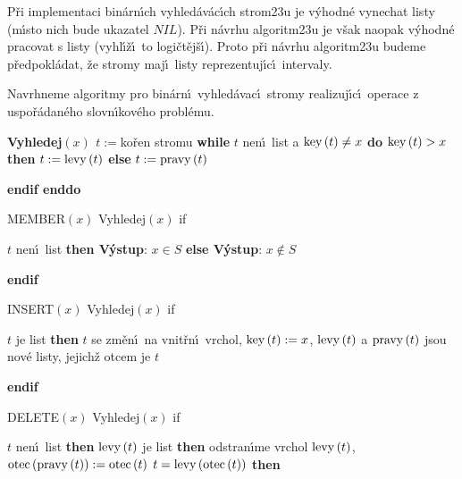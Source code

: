 \flushpar P\v ri implementaci bin\'arn\'\i ch vyhled\'av\'ac\'\i ch 
strom\accent23u je v\'yhodn\'e vynechat listy (m\'\i sto nich bude 
ukazatel $NIL$). P\v ri n\'avrhu algoritm\accent23u je v\v sak 
naopak v\'yhodn\'e 
pracovat s listy (vyhl\'\i\v z\'\i\ to logi\v ct\v ej\v s\'\i ). Proto p\v ri n\'avrhu 
algoritm\accent23u budeme p\v redpokl\'adat, \v ze stromy maj\'\i\ 
listy reprezentuj\'\i c\'\i\ intervaly.
\medskip

\flushpar Navrhneme algoritmy pro bin\'arn\'\i\ vyhled\'avac\'\i\ stromy 
rea\-lizuj\'\i\-c\'\i\ operace z uspo\v r\'adan\'eho slovn\'\i kov\'eho probl\'emu.
\medskip

{\bf Vyhledej$\left(x\right)$\newline 
$t:=$}ko\v ren stromu\newline 
{\bf while} $t$ nen\'\i\ list a $\operatorname{key}\left(t\right)\ne x$ {\bf do}\newline 
\phantom{---}{\bf if} $\operatorname{key}\left(t\right)>x$ {\bf then} $t:=\operatorname{levy}\left(t\right)$ {\bf else} $t:=\operatorname{pravy}\left(t\right)$ {\bf endif\newline 
enddo
\medskip

MEMBER$\left(x\right)$\newline 
Vyhledej$\left(x\right)$\newline 
if} $t$ nen\'\i\ list {\bf then V\'ystup}: $x\in S$ {\bf else V\'ystup}: $
x\notin S$ {\bf endif
\medskip

INSERT$\left(x\right)$\newline 
Vyhledej$\left(x\right)$\newline 
if} $t$ je list {\bf then}\newline 
\phantom{---}$t$ se zm\v en\'\i\ na vnit\v rn\'\i\ vrchol, $\operatorname{key}\left(t\right):=x$,\newline 
\phantom{---}$\operatorname{levy}\left(t\right)$ a $\operatorname{pravy}\left(t\right)$ jsou nov\'e listy, jejich\v z otcem je $t$\newline 
{\bf endif
\medskip

DELETE$\left(x\right)$\newline 
Vyhledej$\left(x\right)$\newline 
if} $t$ nen\'\i\ list {\bf then}\newline 
\phantom{---}{\bf if} $\operatorname{levy}\left(t\right)$ je list {\bf then\newline}
\phantom{------}odstran\'\i me vrchol $\operatorname{levy}\left(t\right)$, $\operatorname{otec}\left(\operatorname{pravy}\left(t\right)\right):=\operatorname{otec}\left(t\right)$\newline 
\phantom{------}{\bf if} $t=\operatorname{levy}\left(\operatorname{otec}\left(t\right)\right)$ {\bf then}\newline
